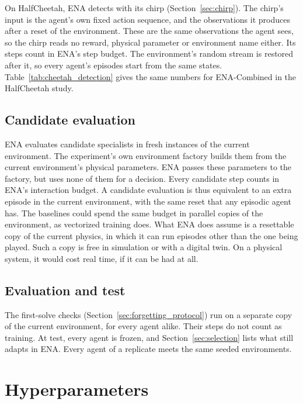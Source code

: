 

On HalfCheetah, ENA detects with its chirp (Section~\ref{sec:chirp}). The chirp's input is the agent's own fixed action sequence, and the observations it produces after a reset of the environment. These are the same observations the agent sees, so the chirp reads no reward, physical parameter or environment name either. Its steps count in ENA's step budget. The environment's random stream is restored after it, so every agent's episodes start from the same states. Table~\ref{tab:cheetah_detection} gives the same numbers for ENA-Combined in the HalfCheetah study.



\subsection{Candidate evaluation}
ENA evaluates candidate specialists in fresh instances of the current environment. The experiment's own environment factory builds them from the current environment's physical parameters. ENA passes these parameters to the factory, but uses none of them for a decision. Every candidate step counts in ENA's interaction budget. A candidate evaluation is thus equivalent to an extra episode in the current environment, with the same reset that any episodic agent has. The baselines could spend the same budget in parallel copies of the environment, as vectorized training does. What ENA does assume is a resettable copy of the current physics, in which it can run episodes other than the one being played. Such a copy is free in simulation or with a digital twin. On a physical system, it would cost real time, if it can be had at all.

\subsection{Evaluation and test}
The first-solve checks (Section~\ref{sec:forgetting_protocol}) run on a separate copy of the current environment, for every agent alike. Their steps do not count as training. At test, every agent is frozen, and Section~\ref{sec:selection} lists what still adapts in ENA. Every agent of a replicate meets the same seeded environments.

\section{Hyperparameters}
\label{app:hyperparameters}

